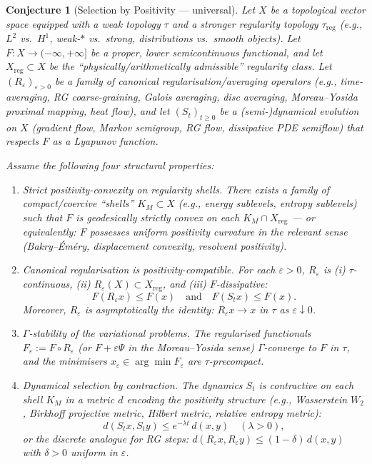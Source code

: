 \documentclass[12pt,a4paper]{article}
\newtheorem{conjecture}[theorem]{Conjecture}
\theoremstyle{definition}
\theoremstyle{remark}
\begin{document}
\begin{conjecture}[Selection by Positivity --- universal]
\label{conj:selection-by-positivity}
Let $X$ be a topological vector space equipped with a weak topology $\tau$ and a stronger regularity topology $\tau_{\mathrm{reg}}$ (e.g., $L^2$ vs.\ $H^1$, weak-$*$ vs.\ strong, distributions vs.\ smooth objects). Let $F: X \to (-\infty, +\infty]$ be a proper, lower semicontinuous functional, and let $X_{\mathrm{reg}} \subset X$ be the ``physically/arithmetically admissible'' regularity class. Let $(R_\varepsilon)_{\varepsilon > 0}$ be a family of canonical regularisation/averaging operators (e.g., time-averaging, RG coarse-graining, Galois averaging, disc averaging, Moreau--Yosida proximal mapping, heat flow), and let $(S_t)_{t \geq 0}$ be a (semi-)dynamical evolution on $X$ (gradient flow, Markov semigroup, RG flow, dissipative PDE semiflow) that respects $F$ as a Lyapunov function.

Assume the following four structural properties:

\begin{enumerate}
\item[\textup{(SP1)}] \emph{Strict positivity-convexity on regularity shells.}
There exists a family of compact/coercive ``shells'' $K_M \subset X$ (e.g., energy sublevels, entropy sublevels) such that $F$ is geodesically strictly convex on each $K_M \cap X_{\mathrm{reg}}$ --- or equivalently: $F$ possesses uniform positivity curvature in the relevant sense (Bakry--\'Em\'ery, displacement convexity, resolvent positivity).

\item[\textup{(SP2)}] \emph{Canonical regularisation is positivity-compatible.}
For each $\varepsilon > 0$, $R_\varepsilon$ is (i) $\tau$-continuous, (ii) $R_\varepsilon(X) \subset X_{\mathrm{reg}}$, and (iii) $F$-dissipative:
\[
F(R_\varepsilon x) \leq F(x) \quad \text{and} \quad F(S_t x) \leq F(x).
\]
Moreover, $R_\varepsilon$ is asymptotically the identity: $R_\varepsilon x \to x$ in $\tau$ as $\varepsilon \downarrow 0$.

\item[\textup{(SP3)}] \emph{$\Gamma$-stability of the variational problems.}
The regularised functionals $F_\varepsilon := F \circ R_\varepsilon$ (or $F + \varepsilon \Psi$ in the Moreau--Yosida sense) $\Gamma$-converge to $F$ in $\tau$, and the minimisers $x_\varepsilon \in \arg\min F_\varepsilon$ are $\tau$-precompact.

\item[\textup{(SP4)}] \emph{Dynamical selection by contraction.}
The dynamics $S_t$ is contractive on each shell $K_M$ in a metric $d$ encoding the positivity structure (e.g., Wasserstein $W_2$, Birkhoff projective metric, Hilbert metric, relative entropy metric):
\[
d(S_t x, S_t y) \leq e^{-\lambda t} \, d(x, y) \quad (\lambda > 0),
\]
or the discrete analogue for RG steps: $d(R_\varepsilon x, R_\varepsilon y) \leq (1-\delta) \, d(x,y)$ with $\delta > 0$ uniform in $\varepsilon$.
\end{enumerate}


\end{conjecture}
\end{document}
